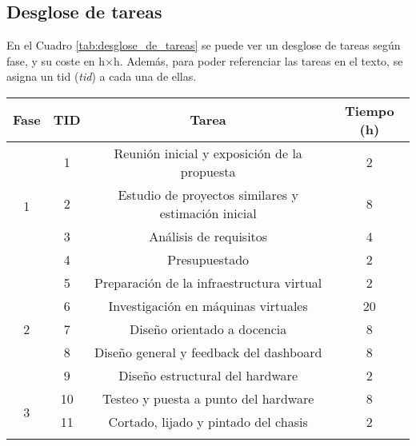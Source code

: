 \subsection{Desglose de tareas}
En el Cuadro \ref{tab:desglose_de_tareas} se puede ver un desglose de tareas según fase, y su coste en h$\times$h. Además, para poder referenciar las tareas en el texto, se asigna un \acrshort{tid} (\textit{\acrlong{tid}}) a cada una de ellas. 
\begin{table}[htpb]
  \centering
  \begin{tabular}{ |c|c|c|c| }
  \hline
  \textbf{Fase} & \textbf{TID} & \textbf{Tarea} & \textbf{Tiempo (h)} \\ 
  \hline
  \multirow{4}{*}{1}        & 1     & {Reunión inicial y exposición de la propuesta}                            & 2 \\\cline{2-4}
                            & 2     & {Estudio de proyectos similares y estimación inicial}                     & 8 \\\cline{2-4}
                            & 3     & {Análisis de requisitos}                                                  & 4 \\\cline{2-4}
                            & 4     & {Presupuestado}                                                           & 2 \\
  \hline
  \multirow{5}{*}{2}        & 5     & {Preparación de la infraestructura virtual}                               & 2 \\\cline{2-4}
                            & 6     & {Investigación en máquinas virtuales}                                     & 20 \\\cline{2-4}
                            & 7     & {Diseño orientado a docencia}                                             & 8 \\\cline{2-4}
                            & 8     & {Diseño general y feedback del dashboard}                                 & 8 \\\cline{2-4}
                            & 9     & {Diseño estructural del hardware}                                         & 2 \\
  \hline
  \multirow{5}{*}{3}        & 10    & {Testeo y puesta a punto del hardware}                                    & 8 \\\cline{2-4}
                            & 11    & {Cortado, lijado y pintado del chasis}                                    & 2 \\\cline{2-4}

\end{tabular}
\end{table}
